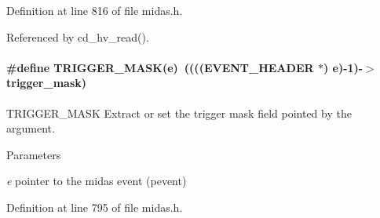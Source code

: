 Definition at line 816 of file midas.h.

Referenced by cd\_\-hv\_\-read().
\paragraph[{TRIGGER\_\-MASK}]{\setlength{\rightskip}{0pt plus 5cm}\#define TRIGGER\_\-MASK(e)~(((({\bf EVENT\_\-HEADER} $\ast$) e)-\/1)-\/$>$trigger\_\-mask)}\hfill\label{group__mbufferh_ga6a0d6be5b8aad5a907d5b880bae93eb9}
TRIGGER\_\-MASK Extract or set the trigger mask field pointed by the argument. 
\begin{DoxyParams}{Parameters}
\item[{\em e}]pointer to the midas event (pevent) \end{DoxyParams}


Definition at line 795 of file midas.h.